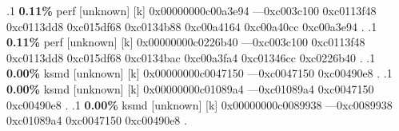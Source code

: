 \begin{profile}
{.1 \textbf{ 0.11\%} perf             [unknown]              [k] 0x00000000c00a3e94\newline {} ---0xc003c100\newline {} 0xc0113f48\newline {} 0xc0113dd8\newline {} 0xc015df68\newline {} 0xc0134b88\newline {} 0xc00a4164\newline {} 0xc00a40cc\newline {} 0xc00a3e94\newline {} . 
.1 \textbf{ 0.11\%} perf             [unknown]              [k] 0x00000000c0226b40\newline {} ---0xc003c100\newline {} 0xc0113f48\newline {} 0xc0113dd8\newline {} 0xc015df68\newline {} 0xc0134bac\newline {} 0xc00a3fa4\newline {} 0xc01346cc\newline {} 0xc0226b40\newline {} . 
.1 \textbf{ 0.00\%} ksmd             [unknown]              [k] 0x00000000c0047150\newline {} ---0xc0047150\newline {} 0xc00490e8\newline {} . 
.1 \textbf{ 0.00\%} ksmd             [unknown]              [k] 0x00000000c01089a4\newline {} ---0xc01089a4\newline {} 0xc0047150\newline {} 0xc00490e8\newline {} . 
.1 \textbf{ 0.00\%} ksmd             [unknown]              [k] 0x00000000c0089938\newline {} ---0xc0089938\newline {} 0xc01089a4\newline {} 0xc0047150\newline {} 0xc00490e8\newline {} . 
}
\end{profile}
